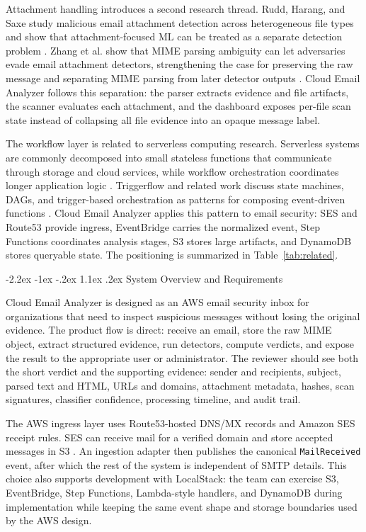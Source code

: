 \documentclass[12pt,a4paper]{article}
\makeatletter
\renewcommand\section{\@startsection {section}{1}{\z@}%
  {-2.2ex \@plus -1ex \@minus -.2ex}%
  {1.1ex \@plus .2ex}%
  {\centering\normalfont\normalsize\bfseries}}
\makeatother
\begin{document}
Attachment handling introduces a second research thread. Rudd, Harang, and Saxe study malicious email attachment detection across heterogeneous file types and show that attachment-focused ML can be treated as a separate detection problem \cite{rudd2018meade}. Zhang et al. show that MIME parsing ambiguity can let adversaries evade email attachment detectors, strengthening the case for preserving the raw message and separating MIME parsing from later detector outputs \cite{zhang2024inbox}. Cloud Email Analyzer follows this separation: the parser extracts evidence and file artifacts, the scanner evaluates each attachment, and the dashboard exposes per-file scan state instead of collapsing all file evidence into an opaque message label.

The workflow layer is related to serverless computing research. Serverless systems are commonly decomposed into small stateless functions that communicate through storage and cloud services, while workflow orchestration coordinates longer application logic \cite{marin2022serverless}. Triggerflow and related work discuss state machines, DAGs, and trigger-based orchestration as patterns for composing event-driven functions \cite{garcia2021triggerflow}. Cloud Email Analyzer applies this pattern to email security: SES and Route53 provide ingress, EventBridge carries the normalized event, Step Functions coordinates analysis stages, S3 stores large artifacts, and DynamoDB stores queryable state. The positioning is summarized in Table~\ref{tab:related}.



\section{System Overview and Requirements}

Cloud Email Analyzer is designed as an AWS email security inbox for organizations that need to inspect suspicious messages without losing the original evidence. The product flow is direct: receive an email, store the raw MIME object, extract structured evidence, run detectors, compute verdicts, and expose the result to the appropriate user or administrator. The reviewer should see both the short verdict and the supporting evidence: sender and recipients, subject, parsed text and HTML, URLs and domains, attachment metadata, hashes, scan signatures, classifier confidence, processing timeline, and audit trail.

The AWS ingress layer uses Route53-hosted DNS/MX records and Amazon SES receipt rules. SES can receive mail for a verified domain and store accepted messages in S3 \cite{aws_ses_receiving}. An ingestion adapter then publishes the canonical \texttt{MailReceived} event, after which the rest of the system is independent of SMTP details. This choice also supports development with LocalStack: the team can exercise S3, EventBridge, Step Functions, Lambda-style handlers, and DynamoDB during implementation while keeping the same event shape and storage boundaries used by the AWS design.
\end{document}
